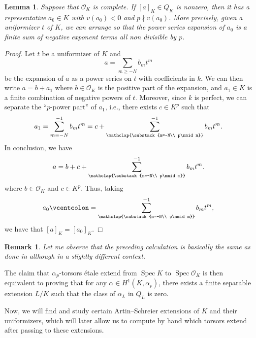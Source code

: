 \documentclass[a4paper,english,12pt]{amsart}
\newtheorem{lemma}[definition]{Lemma}
\newtheorem{remark}[definition]{Remark}
\numberwithin{equation}{section}
\newcommand{\defeq}{\vcentcolon=}
\DeclareMathOperator{\Spec}{Spec}
\renewcommand{\geq}{\geqslant}
\renewcommand{\_}{\rule{0.25cm}{0.4pt}}
\begin{document}
\begin{lemma}\label{forma normal Q_K}
    Suppose that $\mathcal{O}_{K}$ is complete. If $[a]_{K}\in Q_{K}$ is nonzero, then it has a representative $a_{0}\in K$ with $v(a_{0})<0$ and $p\nmid v(a_{0})$. More precisely, given a uniformizer $t$ of $K$, we can arrange so that the power series expansion of $a_{0}$ is a finite sum of negative exponent terms all non divisible by $p$.
\end{lemma}
\begin{proof}
    Let $t$ be a uniformizer of $K$ and
    \[
    a=\sum_{m\geq -N} b_{m}t^{m}
    \]
    be the expansion of $a$ as a power series on $t$ with coefficients in $k$. We can then write $a=b+a_{1}$ where $b\in \mathcal{O}_{K}$ is the positive part of the expansion, and $a_{1}\in K$ is a finite combination of negative powers of $t$.
    Moreover, since $k$ is perfect, we can separate the ``$p$-power part'' of $a_{1}$, i.e., there exists $c\in K^{p}$ such that
    \[
    a_{1}=\sum_{m=-N}^{-1} b_{m}t^{m} = c + \sum_{\mathclap{\substack{m=-N\\
                                     p\nmid m}}}^{-1} b_{m}t^{m}.
    \]
    In conclusion, we have
    \[
    a=b+c+\sum_{\mathclap{\substack{m=-N\\
                                     p\nmid m}}}^{-1} b_{m}t^{m}.
    \]
    where $b\in \mathcal{O}_{K}$ and $c\in K^{p}$. Thus, taking
    \[
    a_{0}\defeq \sum_{\mathclap{\substack{m=-N\\
                                     p\nmid m}}}^{-1} b_{m}t^{m},
    \]
    we have that $[a]_{K}=[a_{0}]_{K}$.
\end{proof}

\begin{remark}
    Let me observe that the preceding calculation is basically the same as done in \cite[Chapter 10.4]{Artin} although in a slightly different context.
\end{remark}

The claim that $\alpha_{p}$-torsors étale extend from $\Spec K$ to $\Spec\mathcal{O}_{K}$ is then equivalent to proving that for any $\alpha\in H^{1}(K,\alpha_{p})$, there exists a finite separable extension $L/K$ such that the class of $\alpha_{L}$ in $Q_{L}$ is zero.

Now, we will find and study certain Artin--Schreier extensions of $K$ and their uniformizers, which will later allow us to compute by hand which torsors extend after passing to these extensions.
\end{document}
